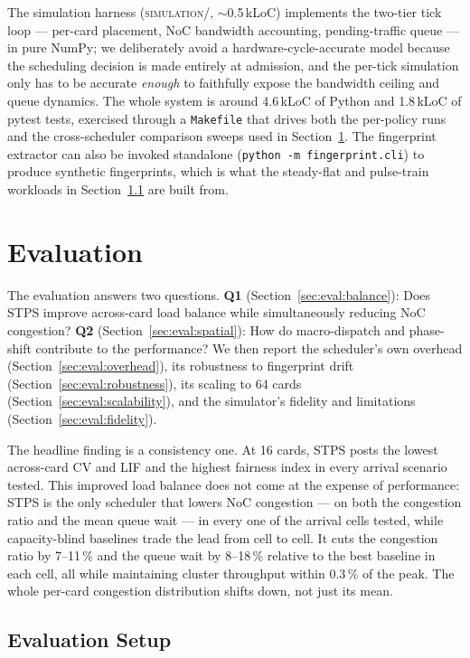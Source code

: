 \documentclass[letterpaper,twocolumn,10pt]{article}
\begin{document}
The simulation harness (\textsc{simulation/}, $\sim$0.5\,kLoC) implements the two-tier tick loop --- per-card placement, NoC bandwidth accounting, pending-traffic queue --- in pure NumPy; we deliberately avoid a hardware-cycle-accurate model because the scheduling decision is made entirely at admission, and the per-tick simulation only has to be accurate \emph{enough} to faithfully expose the bandwidth ceiling and queue dynamics. The whole system is around 4.6\,kLoC of Python and 1.8\,kLoC of pytest tests, exercised through a \texttt{Makefile} that drives both the per-policy runs and the cross-scheduler comparison sweeps used in Section~\ref{sec:eval}. The fingerprint extractor can also be invoked standalone (\texttt{python -m fingerprint.cli}) to produce synthetic fingerprints, which is what the steady-flat and pulse-train workloads in Section~\ref{sec:eval:setup} are built from.


\section{Evaluation}
\label{sec:eval}

The evaluation answers two questions. 
\textbf{Q1} (Section~\ref{sec:eval:balance}): Does STPS improve across-card load balance while simultaneously reducing NoC congestion? 
\textbf{Q2} (Section~\ref{sec:eval:spatial}): How do macro-dispatch and phase-shift contribute to the performance? 
We then report the scheduler's own overhead (Section~\ref{sec:eval:overhead}), 
its robustness to fingerprint drift (Section~\ref{sec:eval:robustness}), its scaling to 64 cards (Section~\ref{sec:eval:scalability}), and the simulator's fidelity and limitations (Section~\ref{sec:eval:fidelity}). 

The headline finding is a consistency one. At 16 cards, STPS posts the lowest across-card CV and LIF and the highest fairness index in every arrival scenario tested. This improved load balance does not come at the expense of performance: STPS is the only scheduler that lowers NoC congestion --- on both the congestion ratio and the mean queue wait --- in every one of the arrival cells tested, while capacity-blind baselines trade the lead from cell to cell. It cuts the congestion ratio by 7--11\,\% and the queue wait by 8--18\,\% relative to the best baseline in each cell, all while maintaining cluster throughput within 0.3\,\% of the peak. The whole per-card congestion distribution shifts down, not just its mean.

\subsection{Evaluation Setup}
\label{sec:eval:setup}
\end{document}
